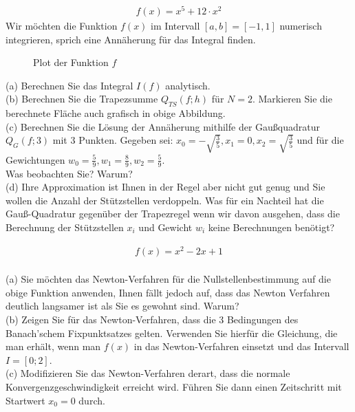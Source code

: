 \documentclass{scrartcl}
\begin{document}
	\begin{align*}
	f(x) = x^5 + 12 \cdot x^2
	\end{align*}
	Wir möchten die Funktion $f(x)$ im Intervall $[a, b] = [-1, 1]$ numerisch integrieren, sprich eine Annäherung für das Integral finden.
	
	\begin{figure}[ht]
		\centering
		\caption{Plot der Funktion $f$}
	\end{figure}
	\noindent(a)
	Berechnen Sie das Integral $I(f)$ analytisch.
	\lbreak \lbreak \lbreak
	\\
	(b)
	Berechnen Sie die Trapezsumme $Q_{TS}(f;h)$ für $N=2$.
	\n 
	Markieren Sie die berechnete Fläche auch grafisch in obige Abbildung.
	\lbreak \lbreak \lbreak
	\\
	(c)
	Berechnen Sie die Lösung der Annäherung mithilfe der Gaußquadratur $Q_G(f;3)$ mit $3$ Punkten. Gegeben sei:
	$x_0 = -\sqrt{\frac{3}{5}}, x_1 = 0, x_2 = \sqrt{\frac{3}{5}}$ und für die Gewichtungen $w_0 = \frac{5}{9}, w_1 = \frac{8}{9}, w_2 = \frac{5}{9}$. \\
	Was beobachten Sie? Warum?
	\lbreak \lbreak \lbreak
	\\
	(d)
	Ihre Approximation ist Ihnen in der Regel aber nicht gut genug und Sie wollen die Anzahl der Stützstellen verdoppeln. Was für ein Nachteil hat die Gauß-Quadratur gegenüber der Trapezregel wenn wir davon ausgehen, dass die Berechnung der Stützstellen $x_i$ und Gewicht $w_i$ keine Berechnungen benötigt?

	
	
	\begin{align*}
		f(x) = x^2 - 2x + 1
	\end{align*}
	\\
	(a)
	Sie möchten das Newton-Verfahren für die Nullstellenbestimmung auf die obige Funktion anwenden, Ihnen fällt jedoch auf, dass das Newton Verfahren deutlich langsamer ist als Sie es gewohnt sind. Warum?
	\lbreak \lbreak \lbreak \lbreak
	\\
	(b)
	Zeigen Sie für das Newton-Verfahren, dass die 3 Bedingungen des Banach'schem Fixpunktsatzes gelten. Verwenden Sie hierfür die Gleichung, die man erhält, wenn man $f(x)$ in das Newton-Verfahren einsetzt und das Intervall $I=[0;2]$.
	\lbreak \lbreak \lbreak \lbreak
	\\
	(c)
	Modifizieren Sie das Newton-Verfahren derart, dass die normale Konvergenzgeschwindigkeit erreicht wird.
	\n 
	Führen Sie dann einen Zeitschritt mit Startwert $x_0=0$ durch.
\end{document}
